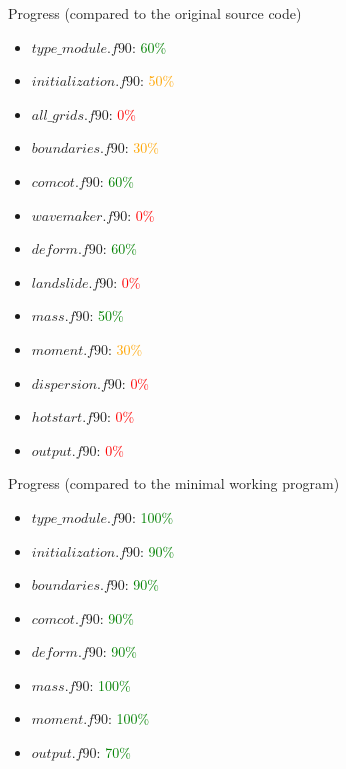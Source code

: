 \documentclass{beamer}
\begin{document}
\begin{frame}{Progress (compared to the original source code)}
    \begin{itemize}
        \item $type\_module.f90$: \textcolor{green}{60\%}
        \item $initialization.f90$: \textcolor{orange}{50\%}
        \item $all\_grids.f90$: \textcolor{red}{0\%}
        \item $boundaries.f90$: \textcolor{orange}{30\%}
        \item $comcot.f90$: \textcolor{green}{60\%}
        \item $wavemaker.f90$: \textcolor{red}{0\%}
        \item $deform.f90$: \textcolor{green}{60\%}
        \item $landslide.f90$: \textcolor{red}{0\%}
        \item $mass.f90$: \textcolor{green}{50\%}
        \item $moment.f90$: \textcolor{orange}{30\%}
        \item $dispersion.f90$: \textcolor{red}{0\%}
        \item $hotstart.f90$: \textcolor{red}{0\%}
        \item $output.f90$: \textcolor{red}{0\%}
    \end{itemize}
\end{frame}

\begin{frame}{Progress (compared to the minimal working program)}
    \begin{itemize}
        \item $type\_module.f90$: \textcolor{green}{100\%}
        \item $initialization.f90$: \textcolor{green}{90\%}
        \item $boundaries.f90$: \textcolor{green}{90\%}
        \item $comcot.f90$: \textcolor{green}{90\%}
        \item $deform.f90$: \textcolor{green}{90\%}
        \item $mass.f90$: \textcolor{green}{100\%}
        \item $moment.f90$: \textcolor{green}{100\%}
        \item $output.f90$: \textcolor{green}{70\%}
    \end{itemize}
\end{frame}
\end{document}
